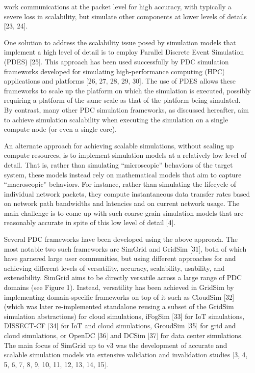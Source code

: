 \documentclass[
]{article}
\begin{document}
work communications at the packet level for high accuracy, with
typically a severe loss in scalability, but simulate other components at
lower levels of details {[}23, 24{]}.

One solution to address the scalability issue posed by simulation models
that implement a high level of detail is to employ Parallel Discrete
Event Simulation (PDES) {[}25{]}. This approach has been used
successfully by PDC simulation frameworks developed for simulating
high-performance computing (HPC) applications and platforms {[}26, 27,
28, 29, 30{]}. The use of PDES allows these frameworks to scale up the
platform on which the simulation is executed, possibly requiring a
platform of the same scale as that of the platform being simulated. By
contrast, many other PDC simulation frameworks, as discussed hereafter,
aim to achieve simulation scalability when executing the simulation on a
single compute node (or even a single core).

An alternate approach for achieving scalable simulations, without
scaling up compute resources, is to implement simulation models at a
relatively low level of detail. That is, rather than simulating
``microscopic'' behaviors of the target system, these models instead
rely on mathematical models that aim to capture ``macroscopic''
behaviors. For instance, rather than simulating the lifecycle of
individual network packets, they compute instantaneous data transfer
rates based on network path bandwidths and latencies and on current
network usage. The main challenge is to come up with such coarse-grain
simulation models that are reasonably accurate in spite of this low
level of detail {[}4{]}.

Several PDC frameworks have been developed using the above approach. The
most notable two such frameworks are SimGrid and GridSim {[}31{]}, both
of which have garnered large user communities, but using different
approaches for and achieving different levels of versatility, accuracy,
scalability, usability, and extensibility. SimGrid aims to be directly
versatile across a large range of PDC domains (see Figure 1). Instead,
versatility has been achieved in GridSim by implementing domain-specific
frameworks on top of it such as CloudSim {[}32{]} (which was later
re-implemented standalone reusing a subset of the GridSim simulation
abstractions) for cloud simulations, iFogSim {[}33{]} for IoT
simulations, DISSECT-CF {[}34{]} for IoT and cloud simulations, GroudSim
{[}35{]} for grid and cloud simulations, or OpenDC {[}36{]} and DCSim
{[}37{]} for data center simulations. The main focus of SimGrid up to v3
was the development of accurate and scalable simulation models via
extensive validation and invalidation studies {[}3, 4, 5, 6, 7, 8, 9,
10, 11, 12, 13, 14, 15{]}.
\end{document}
